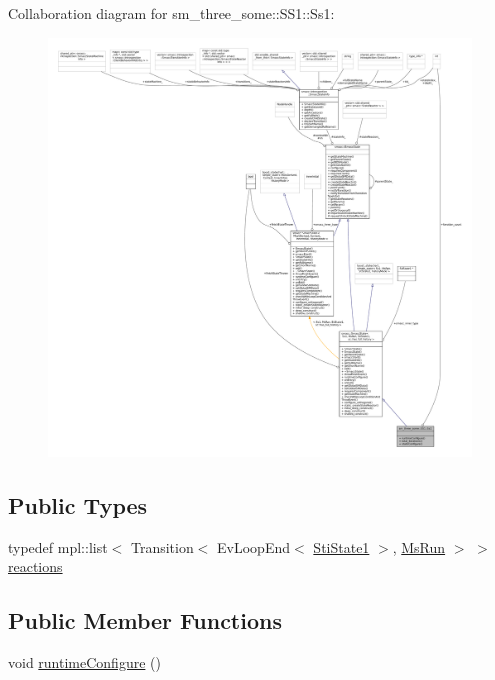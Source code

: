 Collaboration diagram for sm\+\_\+three\+\_\+some\+:\+:S\+S1\+:\+:Ss1\+:
\nopagebreak
\begin{figure}[H]
\begin{center}
\leavevmode
\includegraphics[width=350pt]{structsm__three__some_1_1SS1_1_1Ss1__coll__graph}
\end{center}
\end{figure}
\subsection*{Public Types}
\begin{DoxyCompactItemize}
\item 
typedef mpl\+::list$<$ Transition$<$ Ev\+Loop\+End$<$ \hyperlink{structsm__three__some_1_1ss1__states_1_1StiState1}{Sti\+State1} $>$, \hyperlink{classsm__three__some_1_1MsRun}{Ms\+Run} $>$ $>$ \hyperlink{structsm__three__some_1_1SS1_1_1Ss1_a5b379427d1cef174b121d44dddab7b85}{reactions}
\end{DoxyCompactItemize}
\subsection*{Public Member Functions}
\begin{DoxyCompactItemize}
\item 
void \hyperlink{structsm__three__some_1_1SS1_1_1Ss1_ab19a0f3d403cad31a8b726e8eec366a2}{runtime\+Configure} ()
\end{DoxyCompactItemize}
